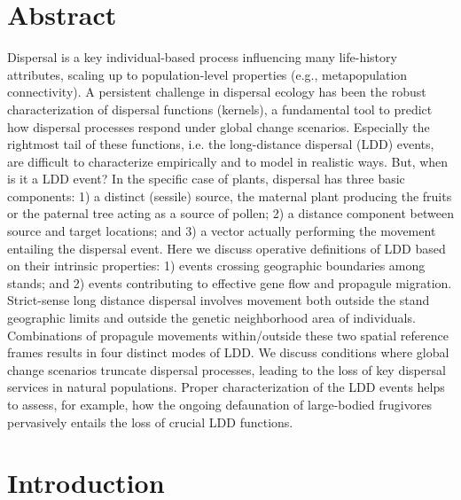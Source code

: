 \documentclass[a4paper, 12pt]{article}
\begin{document}
\section*{Abstract}
\begin{linenumbers}

Dispersal is a key individual-based process influencing many life-history attributes, scaling up to population-level properties (e.g., metapopulation connectivity). A persistent challenge in dispersal ecology has been the robust characterization of dispersal functions (kernels), a fundamental tool to predict how dispersal processes respond under global change scenarios. Especially the rightmost tail of these functions, i.e. the long-distance dispersal (LDD) events, are difficult to characterize empirically and to model in realistic ways. But, when is it a LDD event? In the specific case of plants, dispersal has three basic components: 1) a distinct (sessile) source, the maternal plant producing the fruits or the paternal tree acting as a source of pollen; 2) a distance component between source and target locations; and 3) a vector actually performing the movement entailing the dispersal event. Here we discuss operative definitions of LDD based on their intrinsic properties: 1) events crossing geographic boundaries among stands; and 2) events contributing to effective gene flow and propagule migration. Strict-sense long distance dispersal involves movement both outside the stand geographic limits and outside the genetic neighborhood area of individuals. Combinations of propagule movements within/outside these two spatial reference frames results in four distinct modes of LDD. We discuss conditions where global change scenarios truncate dispersal processes, leading to the loss of key dispersal services in natural populations. Proper characterization of the LDD events helps to assess, for example, how the ongoing defaunation of large-bodied frugivores pervasively entails the loss of crucial LDD functions.

\newpage

\section*{Introduction}


\end{linenumbers}
\end{document}
